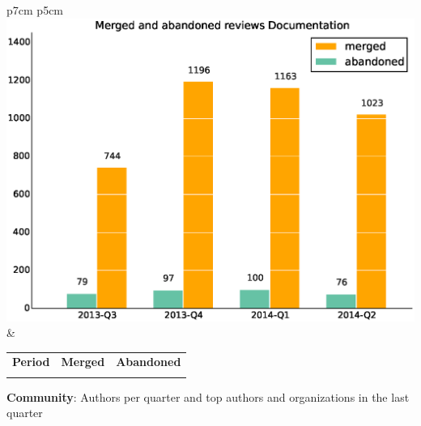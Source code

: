 \documentclass[a4wide,11pt]{report}
\begin{document}
\begin{tabular}{p{7cm} p{5cm}}
    \vspace{0pt} 
    \includegraphics[scale=.35]{figs/submitted_reviewsDocumentation.eps}
    & 
    \vspace{0pt}
    \begin{tabular}{l|r|r|}%
    \bfseries Period & \bfseries Merged & \bfseries Abandoned %
    \csvreader[head to column names]{data/submitted_reviewsDocumentation.csv}{}%
    {\\ & \merged & \abandoned}
    \end{tabular}
\end{tabular}


\textbf{Community}: Authors per quarter and top authors and organizations in the last quarter
\end{document}
